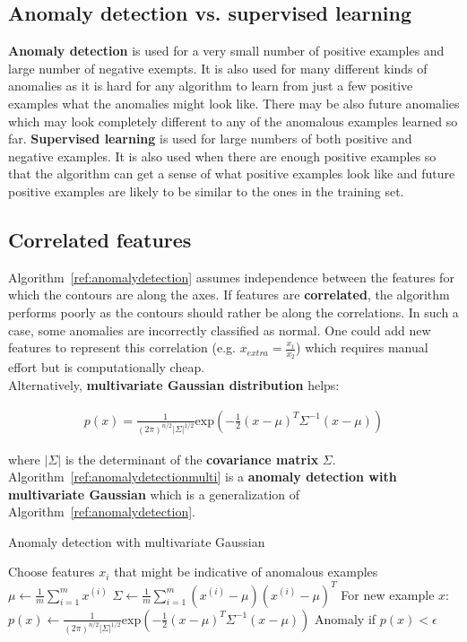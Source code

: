 \documentclass{report}
\begin{document}
\subsection{Anomaly detection vs. supervised learning}
{\bf Anomaly detection} is used for a very small number of positive examples and large number of negative exempts. It is also used for many different kinds of anomalies as it is hard for any algorithm to learn from just a few positive examples what the anomalies might look like. There may be also future anomalies which may look completely different to any of the anomalous examples learned so far. {\bf Supervised learning} is used for large numbers of both positive and negative examples. It is also used when there are enough positive examples so that the algorithm can get a sense of what positive examples look like and future positive examples are likely to be similar to the ones in the training set.

\subsection{Correlated features}
Algorithm~\ref{ref:anomalydetection} assumes independence between the features for which the contours are along the axes. If features are {\bf correlated}, the algorithm performs poorly as the contours should rather be along the correlations. In such a case, some anomalies are incorrectly classified as normal. One could add new features to represent this correlation (e.g. $x_{extra}=\frac{x_1}{x_2}$) which requires manual effort but is computationally cheap. \\

Alternatively, {\bf multivariate Gaussian distribution} helps:

\begin{align*}
p(x)=\frac{1}{(2\pi)^{n/2}\vert \Sigma \vert ^{1/2}}\mbox{exp}(-\frac{1}{2}(x-\mu)^T \Sigma^{-1}(x-\mu))
\end{align*}

where $\vert \Sigma \vert$ is the determinant of the {\bf covariance matrix} $\Sigma$. Algorithm~\ref{ref:anomalydetectionmulti} is a {\bf anomaly detection with multivariate Gaussian} which is a generalization of Algorithm~\ref{ref:anomalydetection}.

\begin{algorithm}
\caption{Anomaly detection with multivariate Gaussian}
\label{ref:anomalydetectionmulti}
\begin{algorithmic}
\State Choose features $x_i$ that might be indicative of anomalous examples
\State $\mu \gets \frac{1}{m}\sum_{i=1}^m x^{(i)}$
\State $\Sigma \gets \frac{1}{m}\sum_{i=1}^m(x^{(i)}-\mu)(x^{(i)}-\mu)^T$
\State For new example $x$: $p(x) \gets \frac{1}{(2\pi)^{n/2}\vert \Sigma \vert ^{1/2}}\mbox{exp}(-\frac{1}{2}(x-\mu)^T \Sigma^{-1}(x-\mu))$ 
\State Anomaly if $p(x) < \epsilon$
\end{algorithmic}
\end{algorithm}
\end{document}
